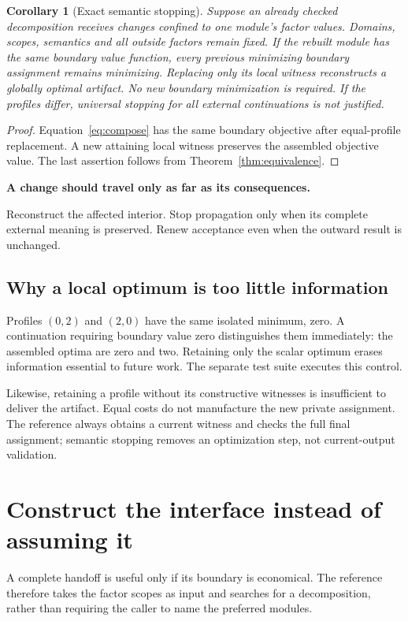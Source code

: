 \documentclass[11pt,letterpaper]{article}
\newtheorem{corollary}[theorem]{Corollary}
\theoremstyle{definition}\newtheorem{definition}[theorem]{Definition}
\theoremstyle{remark}\newtheorem{remark}[theorem]{Remark}
\begin{document}
\begin{corollary}[Exact semantic stopping]
\label{cor:stop}
Suppose an already checked decomposition receives changes confined to one module's factor values. Domains, scopes, semantics and all outside factors remain fixed. If the rebuilt module has the same boundary value function, every previous minimizing boundary assignment remains minimizing. Replacing only its local witness reconstructs a globally optimal artifact. No new boundary minimization is required. If the profiles differ, universal stopping for all external continuations is not justified.
\end{corollary}
\begin{proof}
Equation~\eqref{eq:compose} has the same boundary objective after equal-profile replacement. A new attaining local witness preserves the assembled objective value. The last assertion follows from Theorem~\ref{thm:equivalence}.
\end{proof}

\begin{thesis}
\textbf{A change should travel only as far as its consequences.}\par\smallskip
Reconstruct the affected interior. Stop propagation only when its complete external meaning is preserved. Renew acceptance even when the outward result is unchanged.
\end{thesis}

\subsection{Why a local optimum is too little information}
Profiles $(0,2)$ and $(2,0)$ have the same isolated minimum, zero. A continuation requiring boundary value zero distinguishes them immediately: the assembled optima are zero and two. Retaining only the scalar optimum erases information essential to future work. The separate test suite executes this control.

Likewise, retaining a profile without its constructive witnesses is insufficient to deliver the artifact. Equal costs do not manufacture the new private assignment. The reference always obtains a current witness and checks the full final assignment; semantic stopping removes an optimization step, not current-output validation.

\section{Construct the interface instead of assuming it}
\label{sec:selection}
A complete handoff is useful only if its boundary is economical. The reference therefore takes the factor scopes as input and searches for a decomposition, rather than requiring the caller to name the preferred modules.
\end{document}
